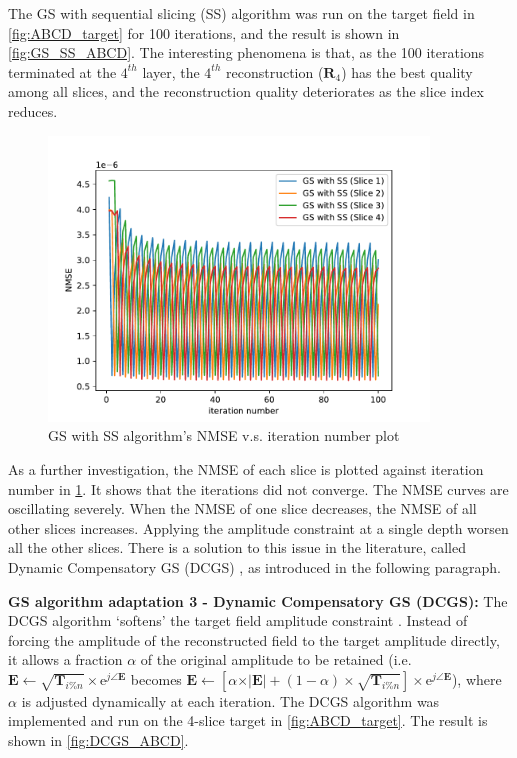 The GS with sequential slicing (SS) algorithm was run on the target field in \cref{fig:ABCD_target} for 100 iterations, and the result is shown in \cref{fig:GS_SS_ABCD}. The interesting phenomena is that, as the 100 iterations terminated at the $4^{th}$ layer, the $4^{th}$ reconstruction ($\textbf{R}_4$) has the best quality among all slices, and the reconstruction quality deteriorates as the slice index reduces.

\begin{figure}[H]
  \centering
  \includegraphics[width=0.9\textwidth]{ABCD/Each_slice_GS.pdf}
  \caption{GS with SS algorithm's NMSE v.s. iteration number plot}
  \label{fig:Each_slice_GS}
\end{figure}

As a further investigation, the NMSE of each slice is plotted against iteration number in \cref{fig:Each_slice_GS}. It shows that the iterations did not converge. The NMSE curves are oscillating severely. When the NMSE of one slice decreases, the NMSE of all other slices increases. Applying the amplitude constraint at a single depth worsen all the other slices. There is a solution to this issue in the literature, called Dynamic Compensatory GS (DCGS) \cite{Zhou2019}, as introduced in the following paragraph.


\textbf{GS algorithm adaptation 3 - Dynamic Compensatory GS (DCGS): }
The DCGS algorithm `softens' the target field amplitude constraint \cite{Zhou2019}. Instead of forcing the amplitude of the reconstructed field to the target amplitude directly, it allows a fraction $\alpha$ of the original amplitude to be retained (i.e. $\textbf{E} \gets \sqrt{\textbf{T}_{i\%n}} \times \mathrm{e}^{j\angle \textbf{E}}$ becomes $\textbf{E} \gets [\alpha \times \vert \textbf{E} \vert + (1-\alpha) \times \sqrt{\textbf{T}_{i\%n}}] \times \mathrm{e}^{j\angle \textbf{E}}$), where $\alpha$ is adjusted dynamically at each iteration. The DCGS algorithm was implemented and run on the 4-slice target in \cref{fig:ABCD_target}. The result is shown in \cref{fig:DCGS_ABCD}.

